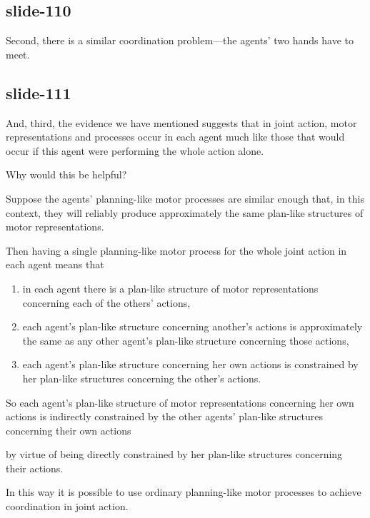 \documentclass[12pt,\papersize]{extarticle}
\begin{document}
\subsection{slide-110}
Second, there is a similar coordination problem---the agents’ two hands have to meet.

\subsection{slide-111}
And, third, the evidence we have mentioned suggests that in joint action, motor representations and processes occur in each agent much like those that would occur if this agent were performing the whole action alone.

Why would this be helpful?



Suppose the agents' planning-like motor processes are similar enough that, in this context, they will reliably produce approximately the same plan-like structures of motor representations.

Then having a single planning-like motor process for the whole joint action in each agent means that

\begin{enumerate}

\item in each agent there is a plan-like structure of motor representations concerning each of the others’ actions,

\item each agent's plan-like structure concerning another's actions is approximately the same as any other agent's plan-like structure concerning those actions,

\item each agent's plan-like structure concerning her own actions is constrained by her plan-like structures concerning the other’s actions.

\end{enumerate}

So each agent’s plan-like structure of motor representations concerning her own actions is indirectly constrained by the other agents' plan-like structures concerning their own actions

by virtue of being directly constrained by her plan-like structures concerning their actions.

In this way it is possible to use ordinary planning-like motor processes to achieve coordination in joint action.
\end{document}
